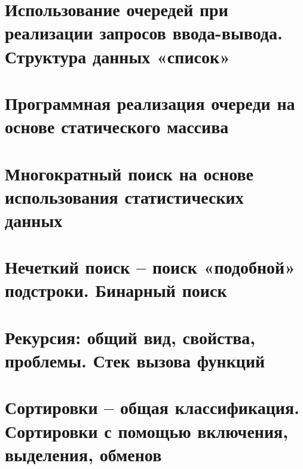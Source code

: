 \section{Использование очередей при реализации запросов ввода-вывода. Структура данных «список»}
\section{Программная реализация очереди на основе статического массива}
\section{Многократный поиск на основе использования статистических данных}
\section{Нечеткий поиск – поиск «подобной» подстроки. Бинарный поиск}
\section{Рекурсия: общий вид, свойства, проблемы. Стек вызова функций}
\section{Сортировки – общая классификация. Сортировки с помощью включения, выделения, обменов}
